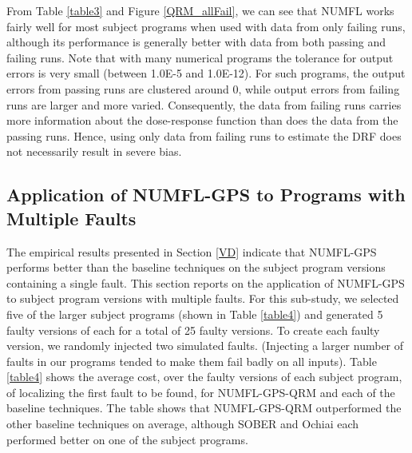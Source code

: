 From Table \ref{table3} and Figure \ref{QRM_allFail}, we can see that NUMFL works fairly well for most subject programs when used with data from only failing runs, although its performance is generally better with data from both passing and failing runs.  Note that with many numerical programs the tolerance for output errors is very small (between 1.0E-5 and 1.0E-12).  For such programs, the output errors from passing runs are clustered around 0, while output errors from failing runs are larger and more varied.  Consequently, the data from failing runs carries more information about the dose-response function than does the data from the passing runs.  Hence, using only data from failing runs to estimate the DRF does not necessarily result in severe bias.

\subsection{Application of NUMFL-GPS to Programs with Multiple Faults}
The empirical results presented in Section \ref{VD} indicate that NUMFL-GPS performs better than the baseline techniques on the subject program versions containing a single fault.  This section reports on the application of NUMFL-GPS to subject program versions with multiple faults.  For this sub-study, we selected five of the larger subject programs (shown in Table \ref{table4}) and generated 5 faulty versions of each for a total of 25 faulty versions.  To create each faulty version, we randomly injected two simulated faults. (Injecting a larger number of faults in our programs tended to make them fail badly on all inputs).  Table \ref{table4} shows the average cost, over the faulty versions of each subject program, of localizing the first fault to be found, for NUMFL-GPS-QRM and each of the baseline techniques.  The table shows that NUMFL-GPS-QRM outperformed the other baseline techniques on average, although SOBER and Ochiai each performed better on one of the subject programs.
